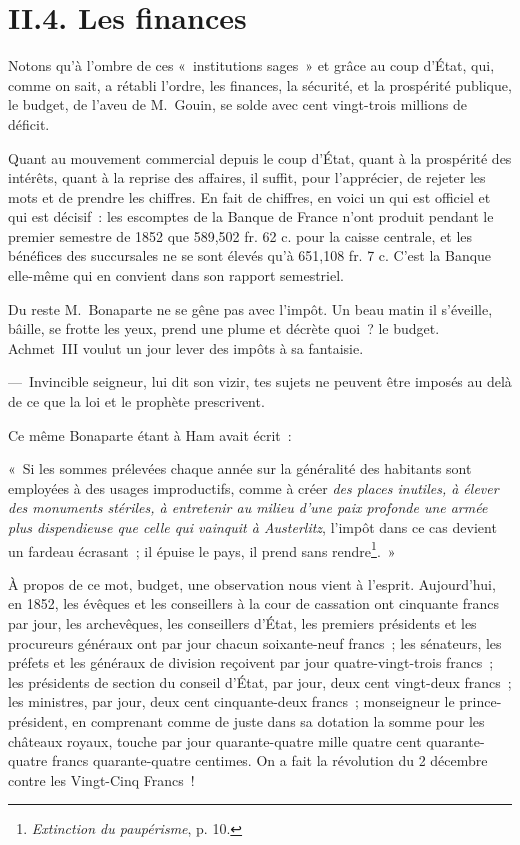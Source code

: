 \documentclass[french,twoside]{book} %
\newenvironment{quoteblock}%
  {\begin{quoting}}
  {\end{quoting}}
\newenvironment{quotebar}{%
    \def\FrameCommand{{\color{rubric!10!}\vrule width 0.5em} \hspace{0.9em}}%
    \def\OuterFrameSep{0pt} %
    \MakeFramed {\advance\hsize-\width \FrameRestore}
  }%
  {%
    \endMakeFramed
  }
\renewenvironment{quoteblock}%
  {%
    \savenotes
    \setstretch{0.9}
    \begin{quotebar}
    \smallskip
  }
  {%
    \smallskip
    \end{quotebar}
    \spewnotes
  }
\begin{document}
\section[{II.4. Les finances}]{II.4. Les finances}

\noindent Notons qu’à l’ombre de ces « institutions sages » et grâce au coup d’État, qui, comme on sait, a rétabli l’ordre, les finances, la sécurité, et la prospérité publique, le budget, de l’aveu de M. Gouin, se solde avec cent vingt-trois millions de déficit.\par
Quant au mouvement commercial depuis le coup d’État, quant à la prospérité des intérêts, quant à la reprise des affaires, il suffit, pour l’apprécier, de rejeter les mots et de prendre les chiffres. En fait de chiffres, en voici un qui est officiel et qui est décisif : les escomptes de la Banque de France n’ont produit pendant le premier semestre de 1852 que 589,502 fr. 62 c. pour la caisse centrale, et les bénéfices des succursales ne se sont élevés qu’à 651,108 fr. 7 c. C’est la Banque elle-même qui en convient dans son rapport semestriel.\par
Du reste M. Bonaparte ne se gêne pas avec l’impôt. Un beau matin il s’éveille, bâille, se frotte les yeux, prend une plume et décrète quoi ? le budget. Achmet III voulut un jour lever des impôts à sa fantaisie.\par
— Invincible seigneur, lui dit son vizir, tes sujets ne peuvent être imposés au delà de ce que la loi et le prophète prescrivent.\par
Ce même Bonaparte étant à Ham avait écrit :\par

\begin{quoteblock}
 \noindent « Si les sommes prélevées chaque année sur la généralité des habitants sont employées à des usages improductifs, comme à créer \emph{des places inutiles, à élever des monuments stériles, à entretenir au milieu d’une paix profonde une armée plus dispendieuse que celle qui vainquit à Austerlitz}, l’impôt dans ce cas devient un fardeau écrasant ; il épuise le pays, il prend sans rendre\footnote{\emph{Extinction du paupérisme}, p. 10.}. »
 \end{quoteblock}

\noindent À propos de ce mot, budget, une observation nous vient à l’esprit. Aujourd’hui, en 1852, les évêques et les conseillers à la cour de cassation ont cinquante francs par jour, les archevêques, les conseillers d’État, les premiers présidents et les procureurs généraux ont par jour chacun soixante-neuf francs ; les sénateurs, les préfets et les généraux de division reçoivent par jour quatre-vingt-trois francs ; les présidents de section du conseil d’État, par jour, deux cent vingt-deux francs ; les ministres, par jour, deux cent cinquante-deux francs ; monseigneur le prince-président, en comprenant comme de juste dans sa dotation la somme pour les châteaux royaux, touche par jour quarante-quatre mille quatre cent quarante-quatre francs quarante-quatre centimes. On a fait la révolution du 2 décembre contre les Vingt-Cinq Francs !
\end{document}
